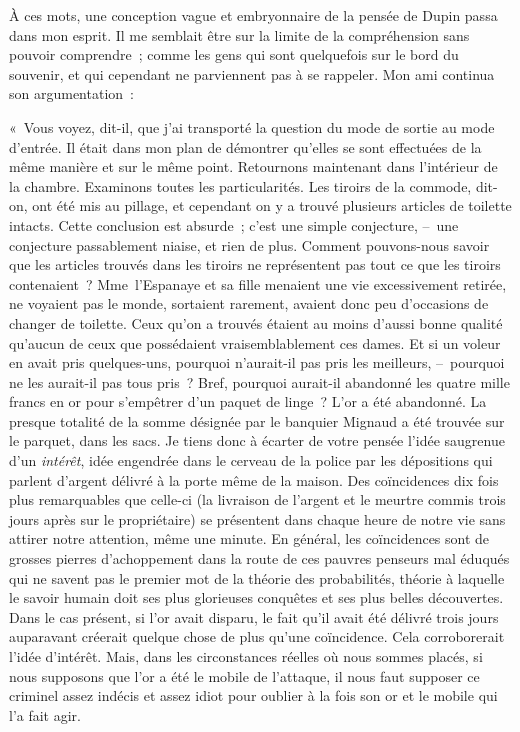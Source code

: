 \documentclass[french,twoside]{book} %
\begin{document}
À ces mots, une conception vague et embryonnaire de la pensée de Dupin passa dans mon esprit. Il me semblait être sur la limite de la compréhension sans pouvoir comprendre ; comme les gens qui sont quelquefois sur le bord du souvenir, et qui cependant ne parviennent pas à se rappeler. Mon ami continua son argumentation :\par
« Vous voyez, dit-il, que j’ai transporté la question du mode de sortie au mode d’entrée. Il était dans mon plan de démontrer qu’elles se sont effectuées de la même manière et sur le même point. Retournons maintenant dans l’intérieur de la chambre. Examinons toutes les particularités. Les tiroirs de la commode, dit-on, ont été mis au pillage, et cependant on y a trouvé plusieurs articles de toilette intacts. Cette conclusion est absurde ; c’est une simple conjecture, – une conjecture passablement niaise, et rien de plus. Comment pouvons-nous savoir que les articles trouvés dans les tiroirs ne représentent pas tout ce que les tiroirs contenaient ? Mme l’Espanaye et sa fille menaient une vie excessivement retirée, ne voyaient pas le monde, sortaient rarement, avaient donc peu d’occasions de changer de toilette. Ceux qu’on a trouvés étaient au moins d’aussi bonne qualité qu’aucun de ceux que possédaient vraisemblablement ces dames. Et si un voleur en avait pris quelques-uns, pourquoi n’aurait-il pas pris les meilleurs, – pourquoi ne les aurait-il pas tous pris ? Bref, pourquoi aurait-il abandonné les quatre mille francs en or pour s’empêtrer d’un paquet de linge ? L’or a été abandonné. La presque totalité de la somme désignée par le banquier Mignaud a été trouvée sur le parquet, dans les sacs. Je tiens donc à écarter de votre pensée l’idée saugrenue d’un \emph{intérêt}, idée engendrée dans le cerveau de la police par les dépositions qui parlent d’argent délivré à la porte même de la maison. Des coïncidences dix fois plus remarquables que celle-ci (la livraison de l’argent et le meurtre commis trois jours après sur le propriétaire) se présentent dans chaque heure de notre vie sans attirer notre attention, même une minute. En général, les coïncidences sont de grosses pierres d’achoppement dans la route de ces pauvres penseurs mal éduqués qui ne savent pas le premier mot de la théorie des probabilités, théorie à laquelle le savoir humain doit ses plus glorieuses conquêtes et ses plus belles découvertes. Dans le cas présent, si l’or avait disparu, le fait qu’il avait été délivré trois jours auparavant créerait quelque chose de plus qu’une coïncidence. Cela corroborerait l’idée d’intérêt. Mais, dans les circonstances réelles où nous sommes placés, si nous supposons que l’or a été le mobile de l’attaque, il nous faut supposer ce criminel assez indécis et assez idiot pour oublier à la fois son or et le mobile qui l’a fait agir.\par
\end{document}

